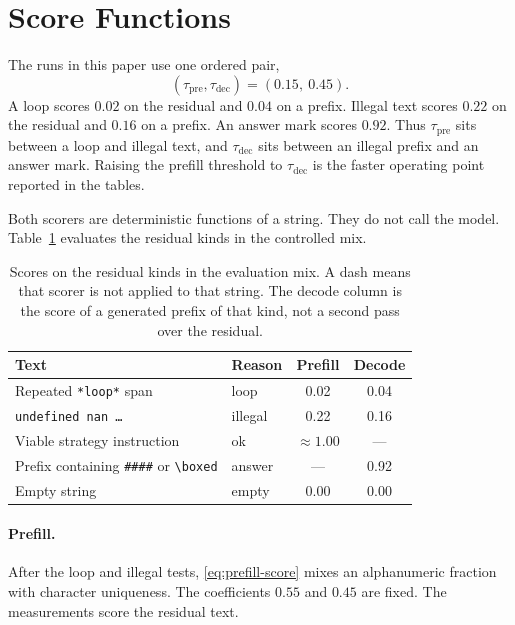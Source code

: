 \section{Score Functions}
\label{app:scores}

The runs in this paper use one ordered pair,
\begin{equation}
\label{eq:pair}
(\tau_{\mathrm{pre}}, \tau_{\mathrm{dec}}) = (0.15,\ 0.45).
\end{equation}
A loop scores $0.02$ on the residual and $0.04$ on a prefix.
Illegal text scores $0.22$ on the residual and $0.16$ on a prefix.
An answer mark scores $0.92$.
Thus $\tau_{\mathrm{pre}}$ sits between a loop and illegal text, and $\tau_{\mathrm{dec}}$ sits between an illegal prefix and an answer mark.
Raising the prefill threshold to $\tau_{\mathrm{dec}}$ is the faster operating point reported in the tables.

Both scorers are deterministic functions of a string.
They do not call the model.
Table~\ref{tab:score-examples} evaluates the residual kinds in the controlled mix.

\begin{table}[h]
\centering
\small
\setlength{\tabcolsep}{4pt}
\begin{tabular}{@{}p{}lcc@{}}
\toprule
Text & Reason & Prefill & Decode \\
\midrule
Repeated \texttt{*loop*} span & loop & 0.02 & 0.04 \\
\texttt{undefined nan \ldots} & illegal & 0.22 & 0.16 \\
Viable strategy instruction & ok & $\approx 1.00$ & --- \\
Prefix containing \texttt{\#\#\#\#} or \texttt{\textbackslash boxed} & answer & --- & 0.92 \\
Empty string & empty & 0.00 & 0.00 \\
\bottomrule
\end{tabular}
\caption{Scores on the residual kinds in the evaluation mix.
A dash means that scorer is not applied to that string.
The decode column is the score of a generated prefix of that kind, not a second pass over the residual.}
\label{tab:score-examples}
\end{table}

\paragraph{Prefill.}
After the loop and illegal tests, \eqref{eq:prefill-score} mixes an alphanumeric fraction with character uniqueness.
The coefficients $0.55$ and $0.45$ are fixed.
The measurements score the residual text.

